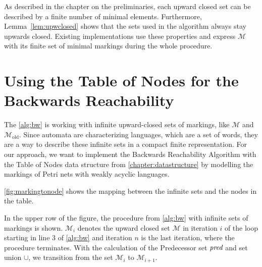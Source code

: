 As described in the chapter on the preliminaries, each upward closed set can be described by a finite number of minimal elements. Furthermore, Lemma~\autoref{lem:upwclosed} shows that the sets used in the algorithm always stay upwards closed. Existing implementations use these properties and express $\mathcal{M}$ with its finite set of minimal markings during the whole procedure.




\section{Using the Table of Nodes for the Backwards Reachability}
The \autoref{alg:bw} is working with infinite upward-closed sets of markings, like $\mathcal{M}$ and $\mathcal{M}_{\text{old}}$. Since automata are characterizing languages, which are a set of words, they are a way to describe these infinite sets in a compact finite representation. For our approach, we want to implement the Backwards Reachability Algorithm with the Table of Nodes data structure from \autoref{chapter:datastructure} by modelling the markings of Petri nets with weakly acyclic languages. 

\par 

\autoref{fig:markingtonode} shows the mapping between the infinite sets and the nodes in the table. 
\par 

In the upper row of the figure, the procedure from \autoref{alg:bw} with infinite sets of markings is shown. 
$\mathcal{M}_{i}$ denotes the upward closed set $\mathcal{M}$ in iteration $i$ of the loop starting in line 3 of \autoref{alg:bw} and iteration $n$ is the last iteration, where the procedure terminates. With the calculation of the Predecessor set $\operatorname{\textit{pred}}$ and set union $\cup$, we transition from the set $\mathcal{M}_{i}$  to $\mathcal{M}_{i+1}$.


